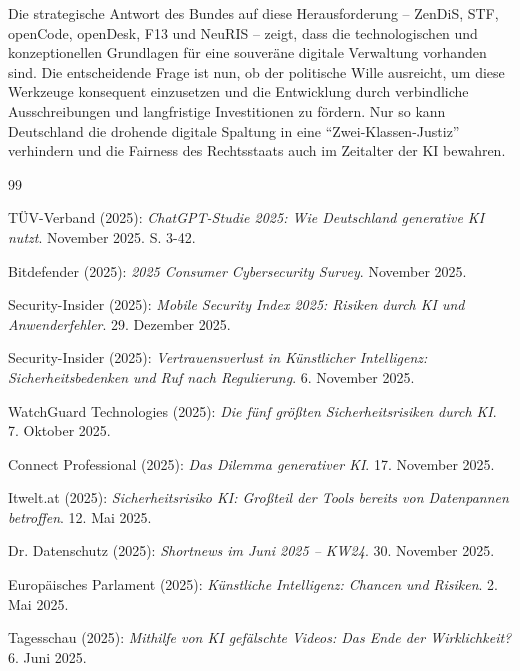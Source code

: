 \documentclass[12pt,a4paper]{article}
\begin{document}
	Die strategische Antwort des Bundes auf diese Herausforderung – ZenDiS, STF, openCode, openDesk, F13 und NeuRIS – zeigt, dass die technologischen und konzeptionellen Grundlagen für eine souveräne digitale Verwaltung vorhanden sind. Die entscheidende Frage ist nun, ob der politische Wille ausreicht, um diese Werkzeuge konsequent einzusetzen und die Entwicklung durch verbindliche Ausschreibungen und langfristige Investitionen zu fördern. Nur so kann Deutschland die drohende digitale Spaltung in eine \enquote{Zwei-Klassen-Justiz} verhindern und die Fairness des Rechtsstaats auch im Zeitalter der KI bewahren.
	
	\newpage
	\begin{thebibliography}{99}
		
		
		 TÜV-Verband (2025): \emph{ChatGPT-Studie 2025: Wie Deutschland generative KI nutzt}. November 2025. S. 3-42.
		
		 Bitdefender (2025): \emph{2025 Consumer Cybersecurity Survey}. November 2025.
		
		 Security-Insider (2025): \emph{Mobile Security Index 2025: Risiken durch KI und Anwenderfehler}. 29. Dezember 2025.
		
		 Security-Insider (2025): \emph{Vertrauensverlust in Künstlicher Intelligenz: Sicherheitsbedenken und Ruf nach Regulierung}. 6. November 2025.
		
		 WatchGuard Technologies (2025): \emph{Die fünf größten Sicherheitsrisiken durch KI}. 7. Oktober 2025.
		
		 Connect Professional (2025): \emph{Das Dilemma generativer KI}. 17. November 2025.
		
		 Itwelt.at (2025): \emph{Sicherheitsrisiko KI: Großteil der Tools bereits von Datenpannen betroffen}. 12. Mai 2025.
		
		 Dr. Datenschutz (2025): \emph{Shortnews im Juni 2025 – KW24}. 30. November 2025.
		
		 Europäisches Parlament (2025): \emph{Künstliche Intelligenz: Chancen und Risiken}. 2. Mai 2025.
		
		 Tagesschau (2025): \emph{Mithilfe von KI gefälschte Videos: Das Ende der Wirklichkeit?} 6. Juni 2025.
		

\end{thebibliography}
\end{document}
